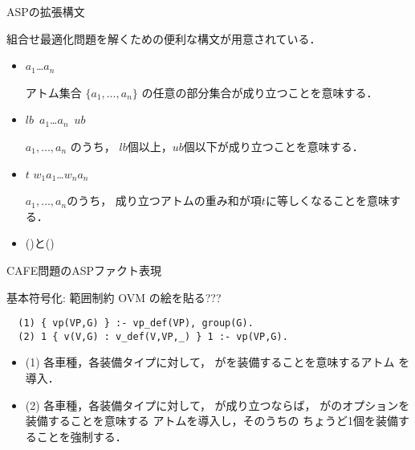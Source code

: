 \documentclass[dvipdfmx, 11pt]{beamer}
\begin{document}
\begin{frame}{ASPの拡張構文}
  \begin{alertblock}{}\centering
    組合せ最適化問題を解くための便利な構文が用意されている．
  \end{alertblock}

  \begin{itemize}
 \item {}
   \begin{center}
     \code{\{}$a_1$\code{;}\ldots\code{;}$a_n$\code{\}}
   \end{center}
   アトム集合 $\{a_1,\dots,a_n\}$
   の任意の部分集合が成り立つことを意味する．
 \item {}
   \begin{center}
     $lb$\ \code{\{}$a_1$\code{;}\ldots\code{;}$a_n$\code{\}}\ $ub$
   \end{center}
   $a_1,\dots,a_n$ のうち，
   $lb$個以上，$ub$個以下が成り立つことを意味する．
 \item {}
   \begin{center}
     $t$  \code{\{} $w_1$\code{:}$a_1$\code{;}\ldots\code{;}$w_n$\code{:}$a_n$ \code{\}}
   \end{center}
   $a_1,\dots,a_n$のうち，
   成り立つアトムの重み和が項$t$に等しくなることを意味する．
 \item {}()と()
 \end{itemize}

\end{frame}
\begin{frame}{CAFE問題のASPファクト表現}
  \begin{multicols}{2}
    \scriptsize
    
  \end{multicols}
\end{frame}
\begin{frame}[fragile]{基本符号化: 範囲制約}
\alert{OVM の絵を貼る???}
\vfill
\begin{exampleblock}{}
\begin{lstlisting}
  (1) { vp(VP,G) } :- vp_def(VP), group(G). 
  (2) 1 { v(V,G) : v_def(V,VP,_) } 1 :- vp(VP,G).
\end{lstlisting}
\end{exampleblock}
\vfill
\begin{itemize}
\item (1)
  各車種，各装備タイプに対して，
  がを装備することを意味するアトム
  を導入．
\item (2)
  各車種，各装備タイプに対して，
  が成り立つならば，
  がのオプションを装備することを意味する
  アトムを導入し，そのうちの
  ちょうど1個を装備することを強制する．
\end{itemize}
\end{frame}
\end{document}
